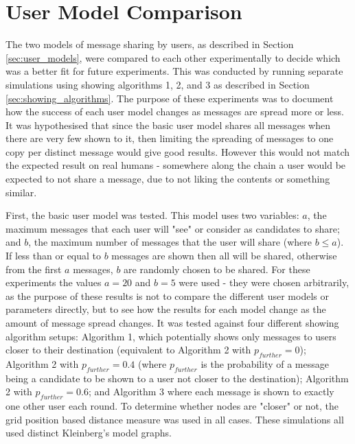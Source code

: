 \documentclass[bsc,frontabs,twoside,singlespacing,parskip,deptreport]{infthesis}     %
\begin{document}
\section{User Model Comparison}
The two models of message sharing by users, as described in Section \ref{sec:user_models}, were compared to each other experimentally to decide which was a better fit for future experiments. This was conducted by running separate simulations using showing algorithms 1, 2, and 3 as described in Section \ref{sec:showing_algorithms}. The purpose of these experiments was to document how the success of each user model changes as messages are spread more or less. It was hypothesised that since the basic user model shares all messages when there are very few shown to it, then limiting the spreading of messages to one copy per distinct message would give good results. However this would not match the expected result on real humans - somewhere along the chain a user would be expected to not share a message, due to not liking the contents or something similar.

First, the basic user model was tested. This model uses two variables: $a$, the maximum messages that each user will "see" or consider as candidates to share; and $b$, the maximum number of messages that the user will share (where $b \leq a$). If less than or equal to $b$ messages are shown then all will be shared, otherwise from the first $a$ messages, $b$ are randomly chosen to be shared. For these experiments the values $a = 20$ and $b = 5$ were used - they were chosen arbitrarily, as the purpose of these results is not to compare the different user models or parameters directly, but to see how the results for each model change as the amount of message spread changes. It was tested against four different showing algorithm setups: Algorithm 1, which potentially shows only messages to users closer to their destination (equivalent to Algorithm 2 with $p_{further}=0$); Algorithm 2 with $p_{further}=0.4$ (where $p_{further}$ is the probability of a message being a candidate to be shown to a user not closer to the destination); Algorithm 2 with $p_{further}=0.6$; and Algorithm 3 where each message is shown to exactly one other user each round. To determine whether nodes are "closer" or not, the grid position based distance measure was used in all cases. These simulations all used distinct Kleinberg's model graphs.
\end{document}
